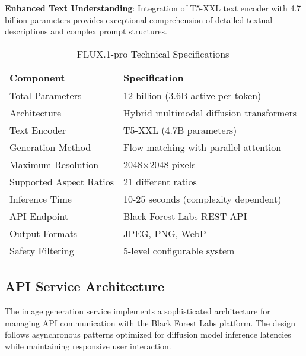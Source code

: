 \textbf{Enhanced Text Understanding}: Integration of T5-XXL text encoder with 4.7 billion parameters provides exceptional comprehension of detailed textual descriptions and complex prompt structures.

\begin{table}[H]
\centering
\caption{FLUX.1-pro Technical Specifications}
\label{tab:flux_technical_specs}
{\begin{tabular}{ll}
\toprule
\textbf{Component} & \textbf{Specification} \\
\midrule
Total Parameters & 12 billion (3.6B active per token) \\
Architecture & Hybrid multimodal diffusion transformers \\
Text Encoder & T5-XXL (4.7B parameters) \\
Generation Method & Flow matching with parallel attention \\
Maximum Resolution & 2048×2048 pixels \\
Supported Aspect Ratios & 21 different ratios \\
Inference Time & 10-25 seconds (complexity dependent) \\
API Endpoint & Black Forest Labs REST API \\
Output Formats & JPEG, PNG, WebP \\
Safety Filtering & 5-level configurable system \\
\bottomrule
\end{tabular}}
\end{table}

\subsection{API Service Architecture}

The image generation service implements a sophisticated architecture for managing API communication with the Black Forest Labs platform. The design follows asynchronous patterns optimized for diffusion model inference latencies while maintaining responsive user interaction.

